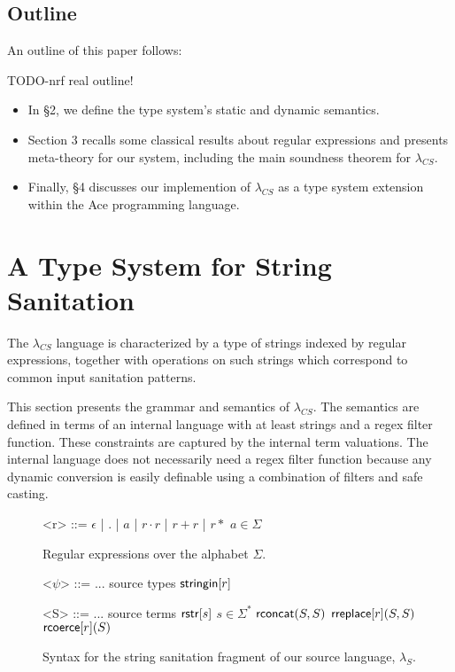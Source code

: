 \documentclass{acm_proc_article-sp}
\theoremstyle{definition}
\newcommand{\lambdas}{\lambda_S}
\newcommand{\sisubst}[3]{{\sf rreplace}[#1](#2,#3)} \newcommand{\rreplace}[3]{{\sf rreplace}[#1](#2,#3)} %
\newcommand{\coerce}[2]{ {\sf rcoerce}[#1](#2)}
\newcommand{\sistr}[1]{{\sf rstr}[#1]}   \newcommand{\rstr}[1]{{\sf rstr}[#1]} %
\newcommand{\strin}[1]{\sistr{#1}}
\newcommand{\rsconcat}[2]{{\sf rconcat}(#1,#2)}
\newcommand{\stringin}[1]{{\sf stringin}[#1]}
\newcommand{\lcs}{\lambda_{CS}}
\begin{document}
\subsection{Outline}

An outline of this paper follows:

TODO-nrf real outline!
\begin{itemize}
  \item In \S 2, we define the type system's static and dynamic semantics.
  \item Section 3 recalls some classical results about regular expressions and presents meta-theory for our system, including
    the main soundness theorem for $\lcs$.
  \item Finally, \S 4 discusses our implemention of $\lcs$ as a type system extension  within the Ace programming language.
\end{itemize}

\section{A Type System for String Sanitation}

The $\lcs$ language is characterized by a type of strings indexed by regular
expressions, together with operations on such strings which correspond to common
input sanitation patterns.

This section presents the grammar and semantics of $\lcs$.
The semantics are defined in terms of an internal language with at least strings and a regex filter function.
These constraints are captured by the internal term valuations.
The internal language does not necessarily need a regex filter function because
any dynamic conversion is easily definable using a combination of filters and safe
casting.
%
%

\renewcommand{\grammarlabel}[2]{#1\hfill#2}

\begin{figure}
\begin{grammar}
<r> ::= $\epsilon$ | $.$ | $a$ | $r \cdot r$ | $r + r$ | $r*$ \hfill $a \in \Sigma$

\caption{Regular expressions over the alphabet $\Sigma$.}
\end{grammar}
\end{figure}

\begin{figure}
\begin{grammar}

<$\psi$> ::=	...			\hfill	source types					\alt
$\stringin{r}$				 

<S> ::= ... \hfill source terms \alt
      $\strin{s}$ \hfill $s \in \Sigma^{*}$ \alt
      $\rsconcat{S}{S}$ \alt
      $\sisubst{r}{S}{S}$ \alt
      $\coerce{r}{S}$
\caption{Syntax for the string sanitation fragment of our source language, $\lambdas$.}
\end{grammar}
\end{figure}
\end{document}
